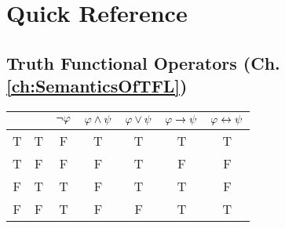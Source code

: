 \chapter[Quick Reference]{Quick Reference}
\section*{Truth Functional Operators (Ch. \ref{ch:SemanticsOfTFL})}


\begin{center}
\begin{tabular}{c c|c|c|c|c|c}
\meta{\varphi} & \meta{\psi} & $\neg \mathcal{\varphi}$ & $\mathcal{\varphi}\wedge\mathcal{\psi}$ & $\mathcal{\varphi}\vee\mathcal{\psi}$ & $\mathcal{\varphi}\rightarrow\mathcal{\psi}$ & $\mathcal{\varphi}\leftrightarrow\mathcal{\psi}$\\
\hline
T & T & F & T & T & T & T\\
T & F & F & F & T & F & F\\
F & T & T & F & T & T & F\\
F & F & T & F & F & T & T
\end{tabular}
\end{center}




